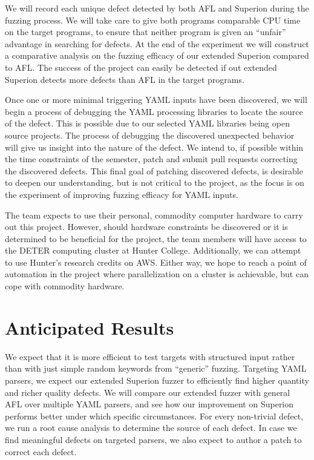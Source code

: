 \documentclass[12pt]{diazessay}
\begin{document}
We will record each unique defect detected by both AFL and Superion during the fuzzing process.
We will take care to give both programs comparable CPU time on the target programs, to ensure that neither program is given an ``unfair'' advantage in searching for defects.
At the end of the experiment we will construct a comparative analysis on the fuzzing efficacy of our extended Superion compared to AFL.
The success of the project can easily be detected if out extended Superion detects more defects than AFL in the target programs.

Once one or more minimal triggering YAML inputs have been discovered, we will begin a process of debugging the YAML processing libraries to locate the source of the defect.
This is possible due to our selected YAML libraries being open source projects.
The process of debugging the discovered unexpected behavior will give us insight into the nature of the defect.
We intend to, if possible within the time constraints of the semester, patch and submit pull requests correcting the discovered defects.
This final goal of patching discovered defects, is desirable to deepen our understanding, but is not critical to the project, as the focus is on the experiment of improving fuzzing efficacy for YAML inputs.

The team expects to use their personal, commodity computer hardware to carry out this project.
However, should hardware constraints be discovered or it is determined to be beneficial for the project, the team members will have access to the DETER computing cluster at Hunter College.
Additionally, we can attempt to use Hunter's research credits on AWS.
Either way, we hope to reach a point of automation in the project where parallelization on a cluster is achievable, but can cope with commodity hardware.


\section*{Anticipated Results}
\label{results}

We expect that it is more efficient to test targets with structured input rather than with just simple random keywords from ``generic'' fuzzing.
Targeting YAML parsers, we expect our extended Superion fuzzer to efficiently find higher quantity and richer quality defects.
We will compare our extended fuzzer with general AFL over multiple YAML parsers, and see how our improvement on Superion performs better under which specific circumstances.
For every non-trivial defect, we run a root cause analysis to determine the source of each defect.
In case we find meaningful defects on targeted parsers, we also expect to author a patch to correct each defect.
\end{document}
